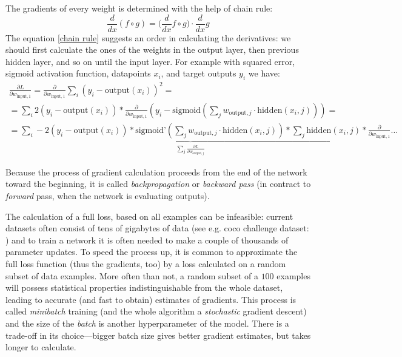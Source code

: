 The gradients of every weight is determined with the help of chain rule:
\begin{equation}\label{chain rule}
  \frac{d}{dx} (f \circ g) = (\frac{d}{dx} f \circ g\big) \cdot \frac{d}{dx}g
\end{equation}
The equation \eqref{chain rule} suggests an order in calculating the derivatives: we should first calculate the ones of the weights in the output layer, then previous hidden layer, and so on until the input layer. For example with squared error, sigmoid activation function, datapoints $x_i$, and target outputs $y_i$ we have:
\begin{multline}
  \frac{\partial L}{\partial w_{\text{input}, 1}} = \frac{\partial}{\partial w_{\text{input}, 1}} \sum_{i} (y_i - \text{output}(x_i))^2 =\\=  \sum_{i} 2(y_i - \text{output}(x_i)) * \frac{\partial}{\partial w_{\text{input}, 1}}
  ( y_i - \text{sigmoid}(\sum_j w_{\text{output}, j} \cdot \text{hidden}(x_i, j))) =\\=
  \underbrace{\sum_{i} -2(y_i - \text{output}(x_i)) * \text{sigmoid'}(\sum_j w_{\text{output}, j} \cdot \text{hidden}(x_i, j)) * \sum_j \text{hidden}(x_i, j)}_{\sum_j \frac{\partial L}{\partial w_{\text{output}, j}}} * \frac{\partial}{\partial w_{\text{input}, 1}}\ldots
\end{multline}

Because the process of gradient calculation proceeds from the end of the network toward the beginning, it is called \emph{backpropagation} or \emph{backward pass} (in contract to \emph{forward} pass, when the network is evaluating outputs).

The calculation of a full loss, based on all examples can be infeasible: current datasets often consist of tens of gigabytes of data (see e.g. coco challenge dataset: \cite{coco-dataset}) and to train a network it is often needed to make a couple of thousands of parameter updates.
To speed the process up, it is common to approximate the full loss function (thus the gradients, too) by a loss calculated on a random subset of data examples. More often than not, a random subset of a $100$ examples will possess statistical properties indistinguishable from the whole dataset, leading to accurate (and fast to obtain) estimates of gradients. This process is called \emph{minibatch} training (and the whole algorithm a \emph{stochastic} gradient descent) and the size of the \emph{batch} is another hyperparameter of the model. There is a trade-off in its choice---bigger batch size gives better gradient estimates, but takes longer to calculate.

